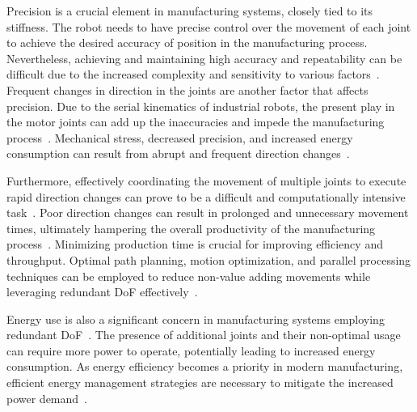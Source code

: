 Precision is a crucial element in manufacturing systems, closely tied to its stiffness. The robot needs to have precise control over the movement of each joint to achieve the desired accuracy of position in the manufacturing process. Nevertheless, achieving and maintaining high accuracy and repeatability can be difficult due to the increased complexity and sensitivity to various factors~\cite{Duong.2021}. %
Frequent changes in direction in the joints are another factor that affects precision. 
Due to the serial kinematics of industrial robots, the present play in the motor joints can add up the inaccuracies and impede the manufacturing process~\cite{Huynh.2020, ChenGang.2014}. Mechanical stress, decreased precision, and increased energy consumption can result from abrupt and frequent direction changes~\cite{Gasparetto.2010}.
 
Furthermore, effectively coordinating the movement of multiple joints to execute rapid direction changes can prove to be a difficult and computationally intensive task~\cite{VandeWeghe.2007}. Poor direction changes can result in prolonged and unnecessary movement times, ultimately hampering the overall productivity of the manufacturing process~\cite{Reiter.2016}. %
Minimizing production time is crucial for improving efficiency and throughput. Optimal path planning, motion optimization, and parallel processing techniques can be employed to reduce non-value adding movements while leveraging redundant DoF effectively~\cite{Boscariol.2020}.




Energy use is also a significant concern in manufacturing systems employing redundant DoF~\cite{Doan.2016}. The presence of additional joints and their non-optimal usage can require more power to operate, potentially leading to increased energy consumption. As energy efficiency becomes a priority in modern manufacturing, efficient energy management strategies are necessary to mitigate the increased power demand~\cite{Boscariol.2020, Boscariol.2019}. 


